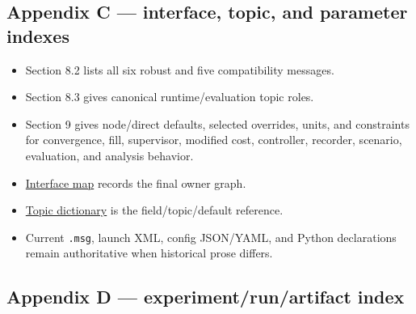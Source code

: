 \documentclass[
  10pt,
  letterpaper,
]{article}
\providecommand{\tightlist}{%
  \setlength{\itemsep}{0pt}\setlength{\parskip}{0pt}}
\begin{document}
\subsection{Appendix C --- interface, topic, and parameter indexes}\label{appendix-c-interface-topic-and-parameter-indexes}

\begin{itemize}
\tightlist
\item
  Section 8.2 lists all six robust and five compatibility messages.
\item
  Section 8.3 gives canonical runtime/evaluation topic roles.
\item
  Section 9 gives node/direct defaults, selected overrides, units, and
  constraints for convergence, fill, supervisor, modified cost, controller,
  recorder, scenario, evaluation, and analysis behavior.
\item
  \href{interface_map.md}{Interface map} records the final owner graph.
\item
  \href{topic_dictionary.md}{Topic dictionary} is the field/topic/default reference.
\item
  Current \nolinkurl{.msg}, launch XML, config JSON/YAML, and Python declarations remain
  authoritative when historical prose differs.
\end{itemize}

\subsection{Appendix D --- experiment/run/artifact index}\label{appendix-d-experimentrunartifact-index}
\end{document}
